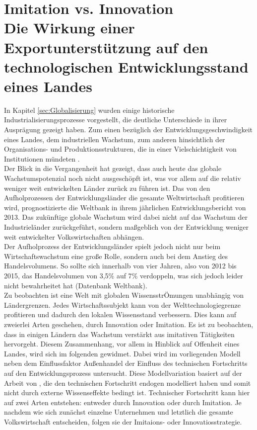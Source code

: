 \chapter{Imitation vs. Innovation\\Die Wirkung einer Exportunterstützung auf den technologischen Entwicklungsstand eines Landes}\label{Papier1}
%
In Kapitel \ref{sec:Globalisierung} wurden einige historische Industrialisierungsprozesse vorgestellt, die deutliche Unterschiede in ihrer Ausprägung gezeigt haben. Zum einen bezüglich der Entwicklungsgeschwindigkeit eines Landes, dem industriellen Wachstum, zum anderen hinsichtlich der Organisations- und Produktionsstrukturen, die in einer Vielschichtigkeit von Institutionen mündeten \cite{Gerschenkron.1962}.\\
%
Der Blick in die Vergangenheit hat gezeigt, dass auch heute das globale Wachstumspotenzial noch nicht ausgeschöpft ist, was vor allem auf die relativ weniger weit entwickelten Länder zurück zu führen ist. Das von den Aufholprozessen der Entwicklungsländer die gesamte Weltwirtschaft profitieren wird, prognostizierte die Weltbank in ihrem jährlichen Entwicklungsbericht von 2013. Das zukünftige globale Wachstum wird dabei nicht auf das Wachstum der Industrieländer zurückgeführt, sondern maßgeblich von der Entwicklung weniger weit entwickelter Volkswirtschaften abhängen. \\
%
 Der Aufholprozess der Entwicklungsländer spielt jedoch nicht nur beim Wirtschaftswachstum eine große Rolle, sondern auch bei dem Anstieg des Handelsvolumens. So sollte sich innerhalb von vier Jahren, also von 2012 bis 2015, das Handelsvolumen von 3,5{\%} auf 7{\%} verdoppeln, was sich jedoch leider nicht bewahrheitet hat (Datenbank Weltbank).\\
%
Zu beobachten ist eine Welt mit globalen WissensstrÖmungen unabhängig von Ländergrenzen. Jedes Wirtschaftssubjekt kann von der Welttechnologiegrenze profitieren und dadurch den lokalen Wissensstand verbessern. Dies kann auf zweierlei Arten geschehen, durch Innovation oder Imitation. Es ist zu beobachten, dass in einigen Ländern das Wachstum verstärkt aus imitativen Tätigkeiten hervorgeht. Diesem Zusammenhang, vor allem in Hinblick auf Offenheit eines Landes, wird sich im folgenden gewidmet. Dabei wird im vorliegenden Modell neben dem Einflussfaktor Außenhandel der Einfluss des technischen Fortschritts auf den Entwicklungsprozess untersucht. Diese Modellvariation basiert auf der Arbeit von \cite{Acemoglu.2006}, die den technischen Fortschritt endogen modelliert haben und somit nicht durch externe Wissenseffekte bedingt ist. Technischer Fortschritt kann hier auf zwei Arten entstehen: entweder durch Innovation oder durch Imitation. Je nachdem wie sich zunächst einzelne Unternehmen und letztlich die gesamte Volkswirtschaft entscheiden, folgen sie der Imitaions- oder Innovatiosstrategie. \\
